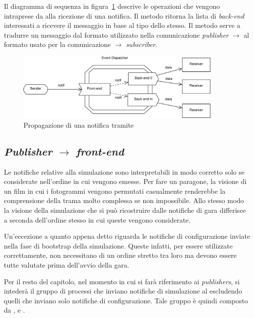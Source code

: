 Il diagramma di sequenza in figura~\ref{fig:dispatcher} descrive le operazioni che vengono intraprese da \evdisp{} alla ricezione di una notifica.
Il metodo  ritorna la lista di \textit{back-end} interessati a ricevere il messaggio  in base al tipo dello stesso.
Il metodo  serve a tradurre un messaggio dal formato utilizzato nella comunicazione \textit{publisher} $\rightarrow$ \evdisp{} al formato usato per la comunicazione \evdisp{} $\rightarrow$ \textit{subscriber}.

\begin{figure}
\includegraphics[width=0.9\textwidth]{diagrammi/Dispatcher}
\caption{Propagazione di una notifica tramite \evdisp{}}
\label{fig:dispatcher}
\end{figure}

\subsection*{\textit{Publisher} $\rightarrow$ \textit{front-end}}
Le notifiche relative alla simulazione sono interpretabili in modo corretto solo se considerate nell'ordine in cui vengono emesse.
Per fare un paragone, la visione di un film in cui i fotogrammi vengono permutati casualmente renderebbe la comprensione della trama molto complessa se non impossibile. Allo stesso modo la visione della simulazione che si può ricostruire dalle notifiche di gara differisce a seconda dell'ordine stesso in cui queste vengono considerate.

Un'eccezione a quanto appena detto riguarda le notifiche di configurazione inviate nella fase di bootstrap della simulazione. Queste infatti, per essere utilizzate correttamente, non necessitano di un ordine stretto tra loro ma devono essere tutte valutate prima dell'avvio della gara.

Per il resto del capitolo, nel momento in cui si farà riferimento ai \textit{publishers}, si intederà il gruppo di processi che inviano notifiche di simulazione al \evdisp{} escludendo quelli che inviano solo notifiche di configurazione. Tale gruppo è quindi composto da \sched{}, \evdisp{} e \car{}.

